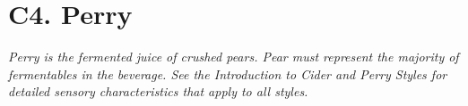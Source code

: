 \section*{C4. Perry}
\textit{Perry is the fermented juice of crushed pears. Pear must represent the majority of fermentables in the beverage. See the Introduction to Cider and Perry Styles for detailed sensory characteristics that apply to all styles.}